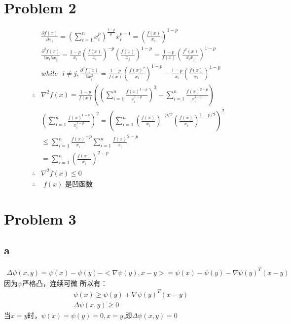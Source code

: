 \documentclass[12pt,a4paper,fontset=none]{ctexart}
\begin{document}
\section{Problem 2}
\begin{align*}
	           & \frac{\partial f(x)}{\partial x_i}=(\sum_{i=1}^{n}x_i^p)^{\frac{1-p}{p} }x_i^{p-1}=(\frac{f(x)}{x_i} )^{1-p}                                                      \\
	           & \frac{\partial^2 f(x)}{\partial x_i\partial x_j}=\frac{1-p}{x_i} (\frac{f(x)}{x_i} )^{-p}(\frac{f(x)}{x_j} )^{1-p}=\frac{1-p}{f(x)}(\frac{f^2(x)}{x_ix_j} )^{1-p} \\
	           & while\text{ } i\neq j,\frac{\partial^2 f(x)}{\partial x_i^2}=\frac{1-p}{f(x)} (\frac{f(x)^2}{x_i} )^{1-p}-\frac{1-p}{x_i} (\frac{f(x)}{x_i} )^{1-p}               \\
	\therefore & \nabla^2f(x)=\frac{1-p}{f(x)} ((\sum_{i=1}^{n}\frac{f(x)^{1-p}}{x_i^{1-p}} )^2-\sum_{i=1}^{n}\frac{f(x)^{2-p}}{x_i^{2-p}} )                                       \\
	           & (\sum_{i=1}^{n}\frac{f(x)^{1-p}}{x_i^{1-p}})^2=(\sum_{i=1}^{n}(\frac{f(x)}{x_i} )^{-p/2}(\frac{f(x)}{x_i})^{1-p/2} )^2                                            \\
	           & \leq \sum_{i=1}^{n}\frac{f(x)}{x_i}^{-p}\sum_{i=1}^{n} \frac{f(x)}{x_i}^{2-p}                                                                                     \\
	           & =\sum_{i=1}^{n}(\frac{f(x)}{x_i} )^{2-p}                                                                                                                          \\
	\therefore & \nabla^2 f(x)\leq 0                                                                                                                                               \\
	\therefore & \text{~$f(x)$~是凹函数 }
\end{align*}

\section{Problem 3}
\subsection{a}
\begin{align*}
	\Delta\psi(x,y)=\psi(x)-\psi(y)-<\nabla\psi(y),x-y> =\psi(x)-\psi(y)-\nabla \psi(y)^T(x-y)
\end{align*}
因为$\psi$严格凸，连续可微
所以有：
\begin{align*}
	 & \psi(x)\geq \psi(y)+\nabla \psi(y)^T(x-y) \\
	 & \Delta\psi(x,y)\geq 0
\end{align*}
当$x=y$时，$\psi(x)=\psi(y)=0,x=y$,即$\Delta\psi(x,y)=0$
\end{document}
